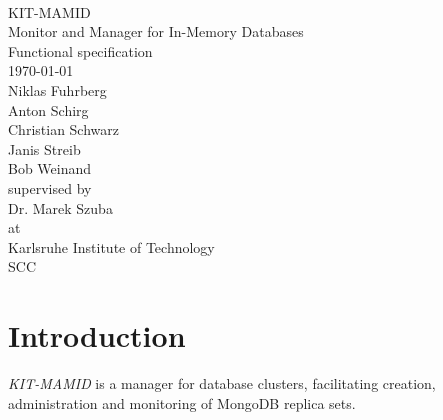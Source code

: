 \documentclass[a4paper, 11pt]{article}
\begin{document}
\newcommand{\refsymbol}[0]{\scalebox{0.5}{$\nearrow$}}
\let\oldref\ref
\renewcommand{\ref}[1]{\refsymbol\oldref{#1}}
\let\oldgls\gls
\renewcommand{\gls}[1]{\refsymbol\oldgls{#1}}
\let\oldGls\Gls
\renewcommand{\Gls}[1]{\refsymbol\oldGls{#1}}
\let\oldglspl\glspl
\renewcommand{\glspl}[1]{\refsymbol\oldglspl{#1}}
\let\oldGlspl\Glspl
\renewcommand{\Glspl}[1]{\refsymbol\oldGlspl{#1}}
\let\oldglslink\glslink
\renewcommand{\glslink}[2]{\refsymbol\oldglslink{#1}{#2}}
\let\oldhyperref\hyperref
\renewcommand{\hyperref}[2][notActuallyOptional]{\refsymbol\oldhyperref[#1]{#2}}
\let\oldautoref\autoref
\renewcommand{\autoref}[1]{\refsymbol\oldautoref{#1}}

\newcommand{\abbildung}[1]{\autoref{fig:#1}}
\newcommand{\mamid}[0]{\textit{KIT-MAMID} }



\begin{titlepage}
\makeatletter
\begin{center}
~\\[4em]
{\Huge KIT-MAMID}\\[.8em]\huge{Monitor and Manager for In-Memory Databases}\\[2em]
{\huge Functional specification}\\[1em]
{\large\today}\\[2.5em]
{\LARGE
Niklas Fuhrberg\\
Anton Schirg\\
Christian Schwarz\\
Janis Streib\\
Bob Weinand\\[3em]}
supervised by\\[2em]
{\Large
Dr. Marek Szuba\\[1em]}
at\\[1em]
{\Large
Karlsruhe Institute of Technology\\
SCC}

\end{center}
\makeatother
\end{titlepage}
\newpage
\tableofcontents
\newpage

\section{Introduction}
\mamid is a manager for database \glspl{cluster}, facilitating creation, administration and monitoring of \gls{MongoDB} \glspl{replica set}.
\end{document}
